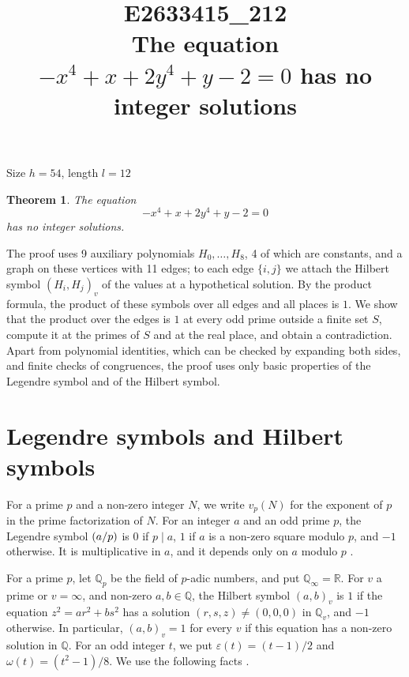 \documentclass[11pt]{article}
\title{\textbf{E2633415\_212}\\[4pt] {\Large The equation $-x^{4}+x+2y^{4}+y-2=0$ has no integer solutions}}
\author{}
\date{}
\newtheorem{theorem}{Theorem}
\newcommand{\Q}{\mathbb{Q}}
\newcommand{\leg}[2]{\mathchoice{\biggl(\dfrac{#1}{#2}\biggr)}{(#1/#2)}{(#1/#2)}{(#1/#2)}}
\begin{document}
\maketitle
\vspace{-8ex}
\begin{center}
Size $h=54$, length $l=12$
\end{center}

\begin{theorem}\label{thm:main}
The equation
\begin{equation}\label{eq:main}
-x^{4}+x+2y^{4}+y-2=0
\end{equation}
has no integer solutions.
\end{theorem}

The proof uses 9 auxiliary polynomials $H_0,\dots,H_{8}$, 4 of which are constants, and a graph on these vertices with 11 edges; to each edge $\{i,j\}$ we attach the Hilbert symbol $(H_i,H_j)_v$ of the values at a hypothetical solution. By the product formula, the product of these symbols over all edges and all places is $1$. We show that the product over the edges is $1$ at every odd prime outside a finite set $S$, compute it at the primes of $S$ and at the real place, and obtain a contradiction. Apart from polynomial identities, which can be checked by expanding both sides, and finite checks of congruences, the proof uses only basic properties of the Legendre symbol and of the Hilbert symbol.

\section{Legendre symbols and Hilbert symbols}

For a prime $p$ and a non-zero integer $N$, we write $v_p(N)$ for the exponent of $p$ in the prime factorization of $N$. For an integer $a$ and an odd prime $p$, the Legendre symbol $\leg{a}{p}$ is $0$ if $p\mid a$, $1$ if $a$ is a non-zero square modulo $p$, and $-1$ otherwise. It is multiplicative in $a$, and it depends only on $a$ modulo $p$ \cite[Chapter~5]{IR}.

For a prime $p$, let $\Q_p$ be the field of $p$-adic numbers, and put $\Q_\infty=\mathbb R$. For $v$ a prime or $v=\infty$, and non-zero $a,b\in\Q$, the Hilbert symbol $(a,b)_v$ is $1$ if the equation $z^2=ar^2+bs^2$ has a solution $(r,s,z)\neq(0,0,0)$ in $\Q_v$, and $-1$ otherwise. In particular, $(a,b)_v=1$ for every $v$ if this equation has a non-zero solution in $\Q$. For an odd integer $t$, we put $\varepsilon(t)=(t-1)/2$ and $\omega(t)=(t^2-1)/8$. We use the following facts \cite[Chapter~III, Proposition~2 and Theorems~1 and~3]{Se}.
\end{document}

